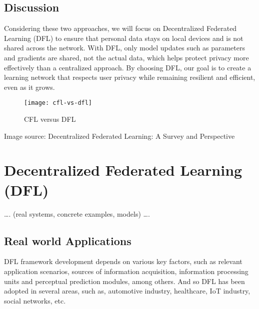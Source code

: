 \subsection{Discussion}
\label{sub:discussion}

Considering these two approaches, we will focus on Decentralized Federated Learning (\gls{DFL}) to ensure that personal data stays on local devices and is not shared across the network. With \gls{DFL}, only model updates such as parameters and gradients are shared, not the actual data, which helps protect privacy more effectively than a centralized approach.
By choosing \gls{DFL}, our goal is to create a learning network that respects user privacy while remaining resilient and efficient, even as it grows.

\begin{figure}[htbp]
  \centering
  \texttt{[image: cfl-vs-dfl]}
  \caption{CFL versus DFL}
  \label{fig:dfl_vs_cfl}
\end{figure}

Image source: Decentralized Federated Learning: A Survey and Perspective

\section{Decentralized Federated Learning (DFL)}
\label{sub:decentralized_federated_learning_2}

…. (real systems, concrete examples, models) ….


\subsection{Real world Applications}
\label{sub:real_worl_applications}

DFL framework development depends on various key factors, such as relevant application scenarios, sources of information acquisition, information processing units and perceptual prediction modules, among others. And so DFL has been adopted in several areas, such as, automotive industry, healthcare, IoT industry, social networks, etc.

